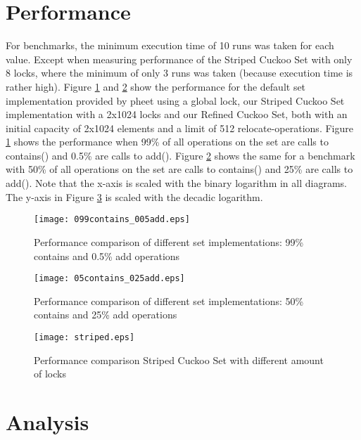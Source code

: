 \documentclass[a4paper,10pt]{article}
\begin{document}
\section{Performance}
\label{sec:performance}
For benchmarks, the minimum execution time of 10 runs was taken for each value. Except when measuring performance of the Striped Cuckoo Set with only 8 locks, where the minimum of only 3 runs was taken (because execution time is rather high).
\medskip
\newline
Figure \ref{fig:plot1} and \ref{fig:plot2} show the performance for the default set implementation provided by pheet using a global lock, our Striped Cuckoo Set implementation with a 2x1024 locks and our Refined Cuckoo Set, both with an initial capacity of 2x1024 elements and a limit of 512 relocate-operations. Figure \ref{fig:plot1} shows the performance when 99\% of all operations on the set are calls to contains() and 0.5\% are calls to add(). Figure \ref{fig:plot2} shows the same for a benchmark with 50\% of all operations on the set are calls to contains() and 25\% are calls to add().
\newline
Note that the x-axis is scaled with the binary logarithm in all diagrams. The y-axis in Figure \ref{fig:plot3} is scaled with the decadic logarithm.

\begin{figure}
\begin{center}
\texttt{[image: 099contains\_005add.eps]}
\end{center}
\caption{Performance comparison of different set implementations: 99\% contains and 0.5\% add operations}
\label{fig:plot1}
\end{figure}

\begin{figure}
\begin{center}
\texttt{[image: 05contains\_025add.eps]}
\end{center}
\caption{Performance comparison of different set implementations: 50\% contains and 25\% add operations}
\label{fig:plot2}
\end{figure}

\begin{figure}
\begin{center}
\texttt{[image: striped.eps]}
\end{center}
\caption{Performance comparison Striped Cuckoo Set with different amount of locks}
\label{fig:plot3}
\end{figure}

\section{Analysis}
\label{sec:analysis}
\end{document}
